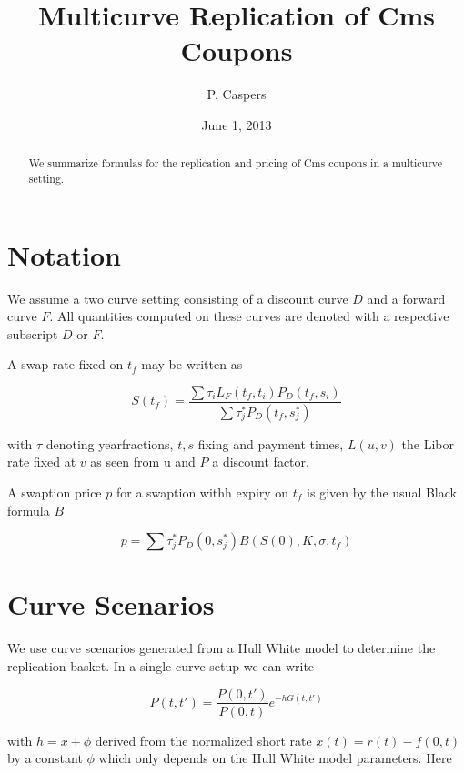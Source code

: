 \documentclass{amsart}
\theoremstyle{plain}
\numberwithin{equation}{section}
\begin{document}
\title[Multicurve Replication of Cms Coupons]{Multicurve Replication of Cms Coupons}
\author{P. Caspers}
\date{June 1, 2013}
\begin{abstract}
We summarize formulas for the replication and pricing of Cms coupons in a multicurve setting.
\end{abstract}

\maketitle

\section{Notation}
We assume a two curve setting consisting of a discount curve $D$ and a forward curve $F$. All quantities computed on 
these curves are denoted with a respective subscript $D$ or $F$.

A swap rate fixed on $t_f$ may be written as

\begin{equation}
S(t_f) = \frac{\sum \tau_i L_F(t_f,t_i) P_D(t_f,s_i)}{\sum \tau^*_j P_D(t_f, s^*_j)}
\end{equation}

with $\tau$ denoting yearfractions, $t, s$ fixing and payment times, $L(u,v)$ the Libor rate fixed at $v$ as seen from u and $P$ a discount factor.

A swaption price $p$ for a swaption withh expiry on $t_f$ is given by the usual Black formula $B$

\begin{equation}
p = \sum \tau^*_j P_D(0,s^*_j) B( S(0), K, \sigma, t_f ) 
\end{equation}

\section{Curve Scenarios}
We use curve scenarios generated from a Hull White model to determine the replication basket. In a single curve setup we can write

\begin{equation}\label{curvescen}
P(t,t') = \frac{P(0,t')}{P(0,t)} e^{ -h G(t,t') }
\end{equation}

with $h = x + \phi$ derived from the normalized short rate $x(t) = r(t)-f(0,t)$ by a constant $\phi$ which only depends on the Hull White model parameters. Here
\end{document}
